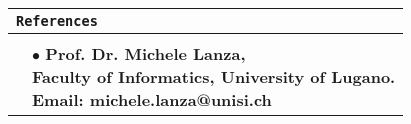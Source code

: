 \documentclass{article}
\newcommand{\cvsectionname}[1]{\multicolumn{2}{l}{\Large \tt #1}\\\hline\\}
\newenvironment{cvsection}[1]{\medskip \begin{tabular}{rl} \cvsectionname{#1}}{\end{tabular}}
\newcommand{\cvreferenceline}[2]{& \parbox[t]{16cm}{$\bullet$ \bf #1, \rm #2}\\\vspace{4pt}}
\begin{document}
\begin{cvsection}{References}
\cvreferenceline{Prof. Dr. Michele Lanza}{\\Faculty of Informatics, University of Lugano. 
\\Email: michele.lanza@unisi.ch\\}
\cvreferenceline{Prof. Dr. Radu Marinescu}{\\Automation and Computer Science Faculty, ``Politehnica'' University of Timi\c{s}oara. 
\\Email: radum@cs.utt.ro\\}
\cvreferenceline{Dr. Wim de Pauw}{\\IBM T.J. Watson Research Center. 
\\Email: wim@us.ibm.ch\\}

\cvreferenceline{Dipl. Ing. Calin Sircuta}{\\Computervoice Systems, Romania. 
\\Email: sircux@computervoice.ro\\}
	
\end{cvsection}
\end{document}
